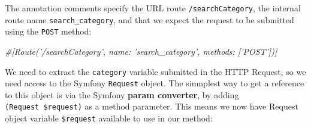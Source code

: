 \documentclass[a4paperpaper,openright]{book}
\newenvironment{Shaded}{}{}
\newcommand{\CommentTok}[1]{\textcolor[rgb]{0.38,0.63,0.69}{\textit{#1}}}
\newcommand{\KeywordTok}[1]{\textcolor[rgb]{0.00,0.44,0.13}{\textbf{#1}}}
\newcommand{\NormalTok}[1]{#1}
\newcommand{\OtherTok}[1]{\textcolor[rgb]{0.00,0.44,0.13}{#1}}
\newcommand{\StringTok}[1]{\textcolor[rgb]{0.25,0.44,0.63}{#1}}
\begin{document}
\begin{Shaded}
\end{Shaded}

The annotation comments specify the URL route \texttt{/searchCategory},
the internal route name \texttt{search\_category}, and that we expect
the request to be submitted using the \texttt{POST} method:

\begin{Shaded}
\begin{Highlighting}[]
    \CommentTok{#[Route('/searchCategory', name: 'search_category', methods: ['POST'])]}
\end{Highlighting}
\end{Shaded}

We need to extract the \texttt{category} variable submitted in the HTTP
Request, so we need access to the Symfony \texttt{Request} object. The
simnplest way to get a reference to this object is via the Symfony
\textbf{param converter}, by adding \texttt{(Request\ \$request)} as a
method parameter. This means we now have Request object variable
\texttt{\$request} available to use in our method:

\begin{Shaded}
\end{Shaded}
\end{document}
